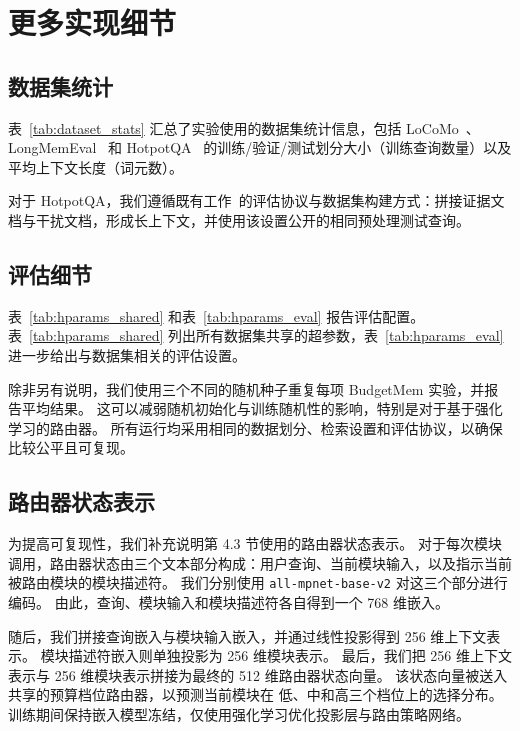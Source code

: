 \section{更多实现细节}
\label{appendix:imple_detail}

\subsection{数据集统计}
\label{appendix:dataset}

表~\ref{tab:dataset_stats} 汇总了实验使用的数据集统计信息，包括 LoCoMo~\citep{maharana2024evaluating-locomo}、LongMemEval~\citep{wu2024longmemeval} 和 HotpotQA~\cite{yang2018hotpotqa} 的训练/验证/测试划分大小（训练查询数量）以及平均上下文长度（词元数）。

对于 HotpotQA，我们遵循既有工作~\citep{yu2025memagent}的评估协议与数据集构建方式：拼接证据文档与干扰文档，形成长上下文，并使用该设置公开的相同预处理测试查询。



\subsection{评估细节}
\label{appendix:exp_eval}

表~\ref{tab:hparams_shared} 和表~\ref{tab:hparams_eval} 报告评估配置。
表~\ref{tab:hparams_shared} 列出所有数据集共享的超参数，表~\ref{tab:hparams_eval} 进一步给出与数据集相关的评估设置。

除非另有说明，我们使用三个不同的随机种子重复每项 BudgetMem 实验，并报告平均结果。
这可以减弱随机初始化与训练随机性的影响，特别是对于基于强化学习的路由器。
所有运行均采用相同的数据划分、检索设置和评估协议，以确保比较公平且可复现。



\subsection{路由器状态表示}
\label{appendix:router_state_representation}

为提高可复现性，我们补充说明第 4.3 节使用的路由器状态表示。
对于每次模块调用，路由器状态由三个文本部分构成：用户查询、当前模块输入，以及指示当前被路由模块的模块描述符。
我们分别使用 \texttt{all-mpnet-base-v2} 对这三个部分进行编码。
由此，查询、模块输入和模块描述符各自得到一个 768 维嵌入。

随后，我们拼接查询嵌入与模块输入嵌入，并通过线性投影得到 256 维上下文表示。
模块描述符嵌入则单独投影为 256 维模块表示。
最后，我们把 256 维上下文表示与 256 维模块表示拼接为最终的 512 维路由器状态向量。
该状态向量被送入共享的预算档位路由器，以预测当前模块在 \textsc{低}、\textsc{中}和\textsc{高}三个档位上的选择分布。
训练期间保持嵌入模型冻结，仅使用强化学习优化投影层与路由策略网络。

